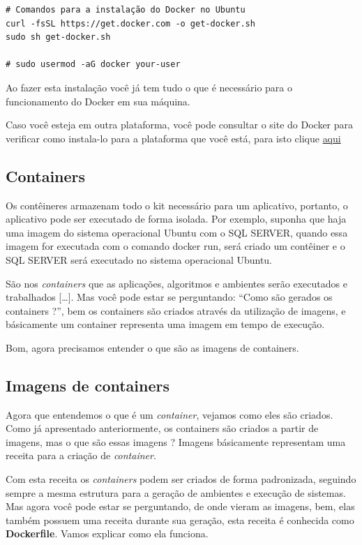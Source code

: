 \documentclass[]{article}
\begin{document}
\begin{verbatim}
# Comandos para a instalação do Docker no Ubuntu
curl -fsSL https://get.docker.com -o get-docker.sh
sudo sh get-docker.sh

# sudo usermod -aG docker your-user
\end{verbatim}

Ao fazer esta instalação você já tem tudo o que é necessário para o funcionamento do Docker em sua máquina.

Caso você esteja em outra plataforma, você pode consultar o site do Docker para verificar como instala-lo para a plataforma que você está, para isto clique \protect\hyperlink{}{aqui}

\hypertarget{containers}{%
\subsection{Containers}\label{containers}}

Os contêineres armazenam todo o kit necessário para um aplicativo, portanto, o aplicativo pode ser executado de forma isolada. Por exemplo, suponha que haja uma imagem do sistema operacional Ubuntu com o SQL SERVER, quando essa imagem for executada com o comando docker run, será criado um contêiner e o SQL SERVER será executado no sistema operacional Ubuntu.

São nos \emph{containers} que as aplicações, algoritmos e ambientes serão executados e trabalhados {[}\ldots{}{]}. Mas você pode estar se perguntando: ``Como são gerados os containers ?'', bem os containers são criados através da utilização de imagens, e básicamente um container representa uma imagem em tempo de execução.

Bom, agora precisamos entender o que são as imagens de containers.

\hypertarget{imagens-de-containers}{%
\subsection{Imagens de containers}\label{imagens-de-containers}}

Agora que entendemos o que é um \emph{container}, vejamos como eles são criados. Como já apresentado anteriormente, os containers são criados a partir de imagens, mas o que são essas imagens ? Imagens básicamente representam uma receita para a criação de \emph{container}.

Com esta receita os \emph{containers} podem ser criados de forma padronizada, seguindo sempre a mesma estrutura para a geração de ambientes e execução de sistemas. Mas agora você pode estar se perguntando, de onde vieram as imagens, bem, elas também possuem uma receita durante sua geração, esta receita é conhecida como \textbf{Dockerfile}. Vamos explicar como ela funciona.
\end{document}
